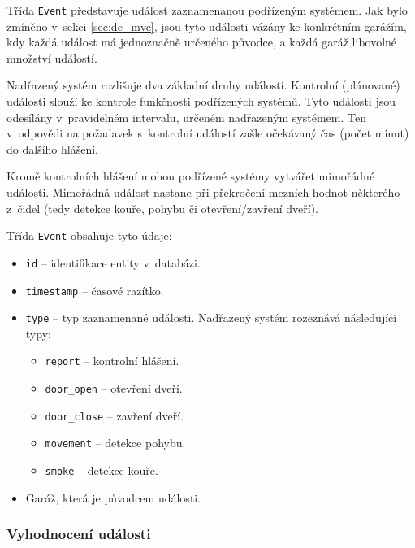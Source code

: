 Třída \texttt{Event} představuje událost zaznamenanou podřízeným systémem. Jak bylo zmíněno v~sekci \ref{sec:de_mvc}, jsou tyto události vázány ke konkrétním garážím, kdy každá událost má jednoznačně určeného původce, a každá garáž libovolné množství událostí.

Nadřazený systém rozlišuje dva základní druhy událostí. Kontrolní (plánované) události slouží ke kontrole funkčnosti podřízených systémů. Tyto události jsou odesílány v~pravidelném intervalu, určeném nadřazeným systémem. Ten v~odpovědi na požadavek s~kontrolní událostí zašle očekávaný čas (počet minut) do dalšího hlášení.

Kromě kontrolních hlášení mohou podřízené systémy vytvářet mimořádné události. Mimořádná událost nastane při překročení mezních hodnot některého z~čidel (tedy detekce kouře, pohybu či otevření/zavření dveří).

Třída \texttt{Event} obsahuje tyto údaje:

\begin{itemize}
    \item \texttt{id} -- identifikace entity v~databázi.
    \item \texttt{timestamp} -- časové razítko.
    \item \texttt{type} -- typ zaznamenané události. Nadřazený systém rozeznává následující typy:
    \begin{itemize}
        \item \texttt{report} -- kontrolní hlášení.
        \item \texttt{door\_open} -- otevření dveří.
        \item \texttt{door\_close} -- zavření dveří.
        \item \texttt{movement} -- detekce pohybu.
        \item \texttt{smoke} -- detekce kouře.
    \end{itemize}
    \item Garáž, která je původcem události.
\end{itemize}

\subsubsection{Vyhodnocení události}

